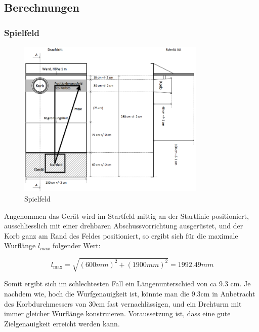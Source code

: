 \subsection{Berechnungen}

\subsubsection{Spielfeld}
\begin{figure}[h!]          
    \centering             
    \includegraphics[width=0.8\textwidth]{fig/Bild_Spielfeld.png}    
    \caption{Spielfeld}
    
    \label{fig:bild}        %
\end{figure}
\noindent
Angenommen das Gerät wird im Startfeld mittig an der Startlinie positioniert, 
ausschliesslich mit einer drehbaren Abschussvorrichtung ausgerüstet, und 
der Korb ganz am Rand des Feldes positioniert, so ergibt sich für die 
maximale Wurflänge $l_{max}$ folgender Wert: 

\[\ l_\text{max} = \sqrt{(600mm)^2 + (1900mm)^2} = 1992.49mm \]

Somit ergibt sich im schlechtesten Fall ein Längenunterschied von ca 9.3 cm. 
Je nachdem wie, hoch die Wurfgenauigkeit ist, könnte man die 9.3cm in 
Anbetracht des Korbdurchmessers von 30cm fast vernachlässigen, und ein 
Drehturm mit immer gleicher Wurflänge konstruieren. Voraussetzung ist, dass 
eine gute Zielgenauigkeit erreicht werden kann.


